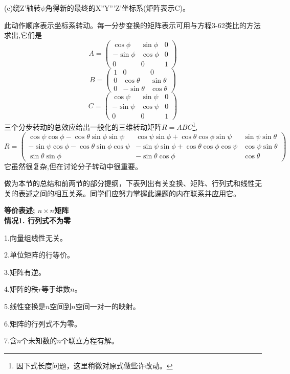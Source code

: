 (c)绕Z'轴转$\psi$角得新的最终的X''Y'''Z'坐标系(矩阵表示C)。

此动作顺序表示坐标系转动。每一分步变换的矩阵表示可用与方程3-62类比的方法求出,它们是
\[A=
\begin{pmatrix}
    \cos \phi & \sin\phi & 0 \\
    -\sin\phi & \cos \phi & 0 \\
    0 & 0 & 1
\end{pmatrix}
\tag{3-63a}
\]
\[B=
\begin{pmatrix}
    1 & 0 & 0 \\
    0 & \cos \theta & \sin\theta \\
    0 & -\sin\theta & \cos \theta
\end{pmatrix}
\tag{3-63b}
\]
\[C=
\begin{pmatrix}
    \cos \psi & \sin\psi & 0 \\
    -\sin\psi & \cos \psi & 0 \\
    0 & 0 & 1
\end{pmatrix}
\tag{3-63c}
\]
三个分步转动的总效应给出一般化的三维转动矩阵$R=ABC$\footnote{因下式长度问题，这里稍微对原式做些许改动。},
\[R=
\begin{pmatrix}
    \cos \psi \cos \phi-\cos \theta \sin\phi \sin\psi & \cos \psi \sin\phi+\cos \theta \cos \phi \sin\psi & \sin\psi \sin\theta \\
    -\sin\psi \cos \phi-\cos \theta \sin\phi \cos \psi & -\sin\psi \sin\phi+\cos \theta \cos \phi \cos \psi & \cos \psi \sin\theta \\
    \sin\theta \sin\phi & -\sin\theta \cos \phi & \cos \theta
\end{pmatrix}
\tag{3-64}
\]
它虽然很复杂,但在讨论分子转动中很重要。

做为本节的总结和前两节的部分提纲，下表列出有关变换、矩阵、行列式和线性无关的表述之间的相互关系。同学们应努力掌握此课题的内在联系并应用它。
\begin{center}
    \textbf{等价表述; $n \times n$矩阵}\\
    \textbf{情况1. 行列式不为零}
\end{center}

1.向量组线性无关。

2.单位矩阵的行等价。

3.矩阵有逆。

4.矩阵的秩$r$等于维数$n$。

5.线性变换是$n$空间到$n$空间一对一的映射。

6.矩阵的行列式不为零。

7.含$n$个未知数的$n$个联立方程有解。

